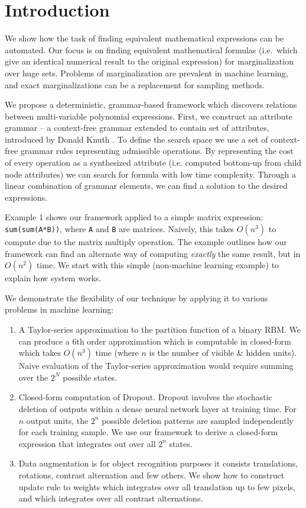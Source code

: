 \section{Introduction} \label{introduction} 

We show how the task of finding equivalent
mathematical expressions can be automated. Our focus is on finding equivalent
mathematical formulas (i.e.~which give an identical numerical result
to the original expression) for marginalization over huge sets. 
Problems of marginalization are prevalent in machine learning, and 
exact marginalizations can be a replacement for sampling methods.


We propose a deterministic, grammar-based framework which discovers
relations between multi-variable polynomial expressions. First, we
construct an attribute grammar -- a context-free grammar extended to
contain set of attributes, introduced by Donald Knuth
\cite{knuth1968semantics}. To define the search space we use a set of
context-free grammar rules representing admissible operations. By
representing the cost of every operation as a synthesized attribute
(i.e. computed bottom-up from child node attributes) we can search for
formula with low time complexity. Through a linear combination of
grammar elements, we can find a solution to the desired
expressions. 


Example 1 shows our framework applied to a simple matrix expression:
\texttt{sum(sum(A*B))}, where \texttt{A} and \texttt{B} are matrices. Naively, this takes $O(n^3)$ to compute due to
the matrix multiply operation. The example outlines how our framework
can find an alternate way of computing {\em exactly} the same result,
but in $O(n^2)$ time. We start with this simple (non-machine learning example) to
explain how system works.

We demonstrate the flexibility of our technique by applying it to 
various problems in machine learning: 
\begin{enumerate}
\vspace{-2mm}
\item A Taylor-series approximation to the partition function of a
  binary RBM. We can produce a 6th order approximation which is
  computable in closed-form which takes $O(n^3)$ time (where $n$ is the
  number of visible \& hidden units). Naive evaluation of the Taylor-series
  approximation would require summing over the $2^N$ possible states.   
\item Closed-form computation of Dropout. Dropout \cite{hinton2012improving}
  involves the  stochastic deletion of outputs within a dense neural
  network layer at training time. For $n$ output units, the $2^n$
  possible deletion patterns are sampled independently for each
  training sample. We use our framework to derive a closed-form
  expression that integrates out over all $2^n$ states.  
\item Data augmentation is for object recognition purposes it consists
  translations, rotations, contrast alternation and few others. We show
  how to construct update rule to weights which integrates over all translation 
  up to few pixels, and which integrates over all contrast alternations.
\end{enumerate}
\vspace{-2mm}

